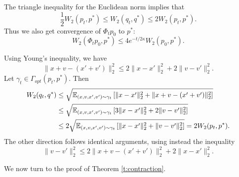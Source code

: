 \begin{lemma}\label{l:sandwich}
The triangle inequality for the Euclidean norm implies that
\begin{equation}\label{e:pqsandwich}
\frac{1}{2}W_2(p_t,p^*) \leq W_2(q_t,q^*) \leq 2W_2(p_t,p^*).
\end{equation}
Thus we also get convergence of $\Phi_t p_0$ to $p^*$:
$$W_2(\Phi_t p_0,p^*) \leq 4e^{- t/2\kappa} W_2(p_0,p^*).$$
\end{lemma}

\begin{Proof}
Using Young's inequality, we have 
$$\|x+v - (x'+v')\|_2^2 \leq 2\|x-x'\|_2^2 +2\|v-v'\|_2^2.$$
Let $\gamma_t \in \Gamma_{opt} (p_t,p^*).$ Then
\begin{align*}
W_2(q_t,q^*) 
&\leq \sqrt{\mathbb{E}_{(x,v,x',v')\sim\gamma_t}\left[\|x-x'\|_2^2 + \|x+v-(x'+v')\|_2^2\right]}\\
&\leq \sqrt{\mathbb{E}_{(x,v,x',v')\sim\gamma_t}\left[3\|x-x'\|_2^2 + 2\|v-v'\|_2^2\right]}\\
&\leq 2\sqrt{\mathbb{E}_{(x,v,x',v')\sim\gamma_t}\left[\|x-x'\|_2^2 + \|v-v'\|_2^2\right]} = 2 W_2(p_t,p^*).
\end{align*}
The other direction follows identical arguments, using instead the inequality
$$\|v-v'\|_2^2 \leq 2\|x+v - (x'+v')\|_2^2 + 2\|x-x'\|_2^2.$$
\end{Proof}

We now turn to the proof of Theorem \ref{t:contraction}.

